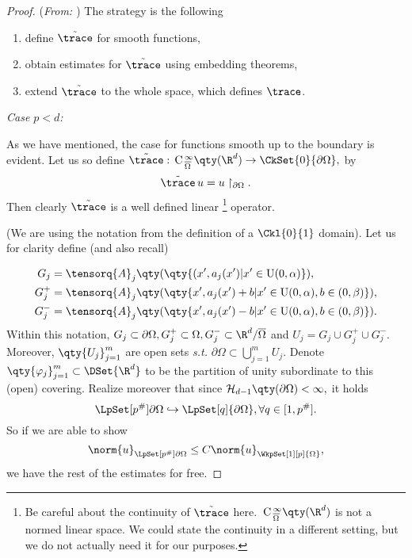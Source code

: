 \begin{proof}(\textit{From: \cite{bulicekUvodModerniTeorie2018}})
	The strategy is the following

	\begin{enumerate}
		\item define $\tilde{\trace}$ for smooth functions,
		\item obtain estimates for $\tilde{\trace}$ using embedding theorems,
		\item extend $\tilde{\trace}$ to the whole space, which defines $\trace$.
	\end{enumerate}

	\textit{Case $p<d$:}

	As we have mentioned, the case for functions smooth up to the boundary is evident. Let us so define $\tilde{\trace}:\, \text{C} \,^{\infty}_{\overline{\Omega}}\qty(\R^{d}) \to \CkSet{0}{\partial \Omega},$ by
	\[
		\tilde{\trace}\, u = u \restriction_{\partial \Omega}.
	\]
Then clearly $\tilde{\trace}$ is a well defined linear  \footnote{Be careful about the continuity of $\tilde{\trace}$ here. $\, \text{C} \,^{\infty}_{\overline{\Omega}}\qty(\R^{d})$ is not a normed linear space. We could state the continuity in a different setting, but we do not actually need it for our purposes.} operator. 

	(We are using the notation from the definition of a $\Ckl{0}{1}$ domain). Let us for clarity define (and also recall)

	\begin{align*}
		G_j &= \tensorq{A}_j\qty(\qty{(x',a_j(x')| x' \in \text{U}(0,\alpha)}),\\
		G_j^+ &= \tensorq{A}_j\qty(\qty{x', a_j(x') + b| x' \in \text{U}(0,\alpha), b \in (0, \beta)}), \\
		G_j^{-} &= \tensorq{A}_j\qty(\qty{x', a_j(x') - b| x' \in \text{U}(0,\alpha), b \in (0,\beta)}).
	\end{align*}
	Within this notation, $G_j \subset \partial \Omega, G_j^{+} \subset \Omega, G_j^{-} \subset \R^{d}/ \overline{\Omega}$ and $U_j = G_j \cup G_j^{+} \cup G_j^{-}.$ Moreover, $\qty{U_j}_{j=1}^m$ are open sets \textit{s.t.} $\partial \Omega \subset \bigcup_{j=1}^m U_j.$ Denote $\qty{\varphi_j}_{j=1}^m \subset \DSet{\R^{d}}$ to be the partition of unity subordinate to this (open) covering. Realize moreover that since $\mathcal{H}_{d-1}\qty(\partial \Omega) < \infty,$ it holds
	\[
		\LpSet[p^{\#}]{\partial \Omega} \hookrightarrow \LpSet[q]{\partial \Omega}, \forall q \in [1, p^{\#}].
	\]
	So if we are able to show
	\[
		\norm{u}_{\LpSet[p^{\#}]{\partial \Omega}}\leq  C \norm{u}_{\WkpSet[1][p]{\Omega}},
	\]
	we have the rest of the estimates for free.


\end{proof}
